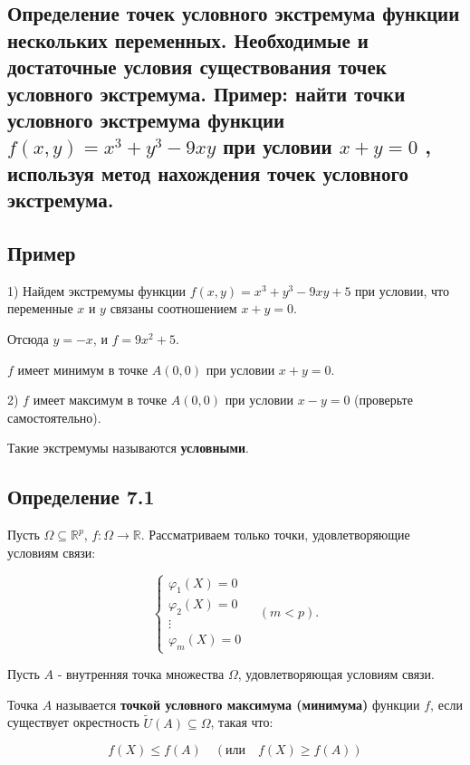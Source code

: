 {
\subsection{ Определение точек условного экстремума функции нескольких переменных. Необходимые и достаточные   условия существования точек условного экстремума. Пример: найти точки условного экстремума функции \( f(x,y) = x^3 + y^3 - 9xy\)   при условии \(x + y = 0\)  ,  используя метод нахождения точек условного экстремума.}

\subsection*{Пример}

1) Найдем экстремумы функции \( f(x, y) = x^3 + y^3 - 9xy + 5 \) при условии, что переменные \( x \) и \( y \) связаны соотношением \( x + y = 0 \).

Отсюда \( y = -x \), и \( f = 9x^2 + 5 \).

\( f \) имеет минимум в точке \( A(0,0) \) при условии \( x + y = 0 \).

2) \( f \) имеет максимум в точке \( A(0,0) \) при условии \( x - y = 0 \) (проверьте самостоятельно).

Такие экстремумы называются \textbf{условными}.

\subsection*{Определение 7.1}

Пусть \( \Omega \subseteq \mathbb{R}^p \), \( f: \Omega \to \mathbb{R} \). Рассматриваем только точки, удовлетворяющие условиям связи:



\[
\begin{cases}
\varphi_1(X) = 0 \\
\varphi_2(X) = 0 \\
\vdots \\
\varphi_m(X) = 0
\end{cases}
\quad (m < p).
\]



Пусть \( A \) - внутренняя точка множества \( \Omega \), удовлетворяющая условиям связи.

Точка \( A \) называется \textbf{точкой условного максимума (минимума)} функции \( f \), если существует окрестность \( \tilde{U}(A) \subseteq \Omega \), такая что:



\[
f(X) \leq f(A) \quad (\text{или} \quad f(X) \geq f(A))
\]



}
